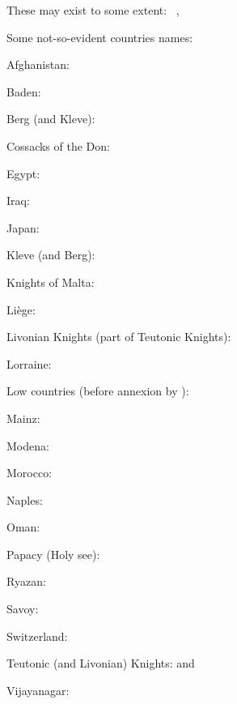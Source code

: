  These may exist to some extent:
%
{\theminorreligionshort{\loopitem}~\pays{\loopitem}}{, }

\aparag Some not-so-evident countries names:
%

\vspace{-\baselineskip}

\begin{multicols}{2}
  \begin{description}
  \item Afghanistan: \paysafghans
  \item Baden: \paysbade
  \item Berg (and Kleve): \paysberg
  \item Cossacks of the Don: \payscosaquesdon
  \item Egypt: \paysegypte
  \item Iraq: \paysirak
  \item Japan: \paysjapon
  \item Kleve (and Berg): \paysberg
  \item Knights of Malta: \payschevaliers
  \item Liège: \paysliege
  \item Livonian Knights (part of Teutonic Knights): 
  \item Lorraine: \payslorraine
  \item Low countries (before annexion by \HIS): \paysprovincesne
  \item Mainz: \paysmayence
  \item Modena: \paysmodene
  \item Morocco: \paysmaroc
  \item Naples: \paysnaples
  \item Oman: \paysoman
  \item Papacy (Holy see): \payspapaute
  \item Ryazan: \paysryazan
  \item Savoy: \payssavoie
  \item Switzerland: \payssuisse
  \item Teutonic (and Livonian) Knights:  and 
  \item Vijayanagar: \paysvijayanagar
  \end{description}
\end{multicols}
\vfill

